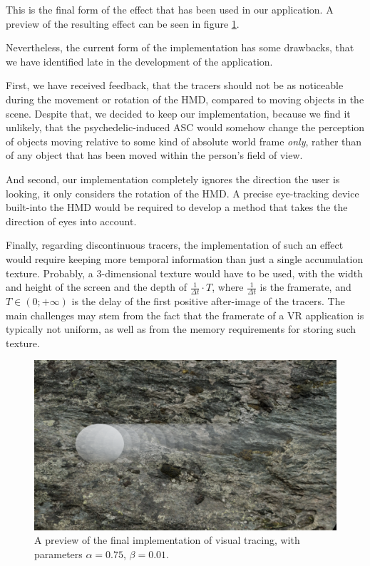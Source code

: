 This is the final form of the effect that has been used in our application. A preview of the resulting effect can be seen in figure \ref{fig:tracers-demo}.

Nevertheless, the current form of the implementation has some drawbacks, that we have identified late in the development of the application.

First, we have received feedback, that the tracers should not be as noticeable during the movement or rotation of the \ac{HMD}, compared to moving objects in the scene. Despite that, we decided to keep our implementation, because we find it unlikely, that the psychedelic-induced \ac{ASC} would somehow change the perception of objects moving relative to some kind of absolute world frame \textit{only}, rather than of any object that has been moved within the person's field of view.

And second, our implementation completely ignores the direction the user is looking, it only considers the rotation of the \ac{HMD}. A precise eye-tracking device built-into the \ac{HMD} would be required to develop a method that takes the the direction of eyes into account.

Finally, regarding discontinuous tracers, the implementation of such an effect would require keeping more temporal information than just a single accumulation texture. Probably, a 3-dimensional texture would have to be used, with the width and height of the screen and the depth of $\frac{1}{\Delta t} \cdot T$, where $\frac{1}{\Delta t}$ is the framerate, and $T \in (0; +\infty)$ is the delay of the first positive after-image of the tracers. The main challenges may stem from the fact that the framerate of a \ac{VR} application is typically not uniform, as well as from the memory requirements for storing such texture.

\begin{figure}[H]
    \centering
    \ifgraphics
        \includegraphics[width=\textwidth]{img/simr-tracers.png}
    \fi
    \caption{A preview of the final implementation of visual tracing, with parameters $\alpha=0.75$, $\beta=0.01$.}\label{fig:tracers-demo}
\end{figure}

